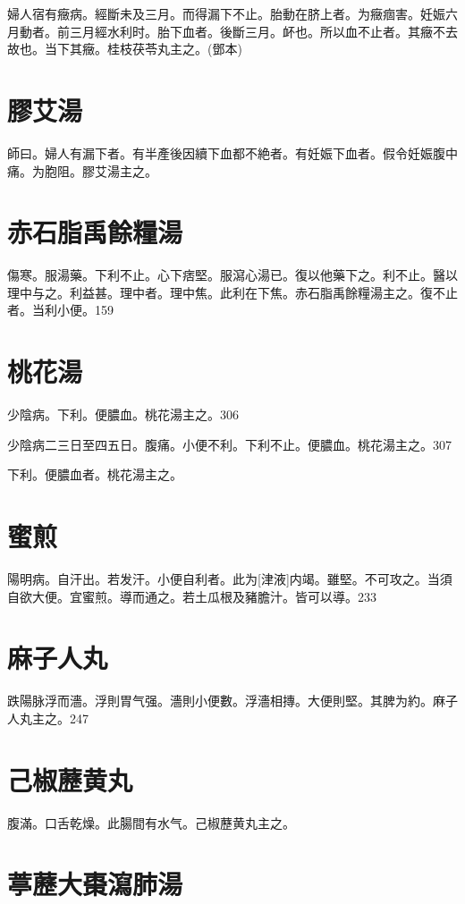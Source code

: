 \documentclass[12pt,oneside,UTF8,b5paper]{ctexbook}她她她她她她她
\begin{document}
婦人宿有癥病。經斷未及三月。而得漏下不止。胎動在脐上者。为癥痼害。妊娠六月動者。前三月經水利时。胎下血者。後斷三月。衃也。所以血不止者。其癥不去故也。当下其癥。桂枝茯苓丸主之。(鄧本)

\section{膠艾湯}

師曰。婦人有漏下者。有半產後因續下血都不絶者。有妊娠下血者。假令妊娠腹中痛。为胞阻。膠艾湯主之。

\section{赤石脂禹餘糧湯}

傷寒。服湯藥。下利不止。心下痞堅。服瀉心湯已。復以他藥下之。利不止。醫以理中与之。利益甚。理中者。理中焦。此利在下焦。赤石脂禹餘糧湯主之。復不止者。当利小便。159

\section{桃花湯}

少陰病。下利。便膿血。桃花湯主之。306

少陰病二三日至四五日。腹痛。小便不利。下利不止。便膿血。桃花湯主之。307

下利。便膿血者。桃花湯主之。

\section{蜜煎}

陽明病。自汗出。若发汗。小便自利者。此为[津液]内竭。雖堅。不可攻之。当須自欲大便。宜蜜煎。導而通之。若土瓜根及豬膽汁。皆可以導。233

\section{麻子人丸}

跌陽脉浮而濇。浮則胃气强。濇則小便數。浮濇相摶。大便則堅。其脾为約。麻子人丸主之。247

\section{己椒藶黄丸}

腹滿。口舌乾燥。此腸間有水气。己椒藶黄丸主之。

\section{葶藶大棗瀉肺湯}
\end{document}

